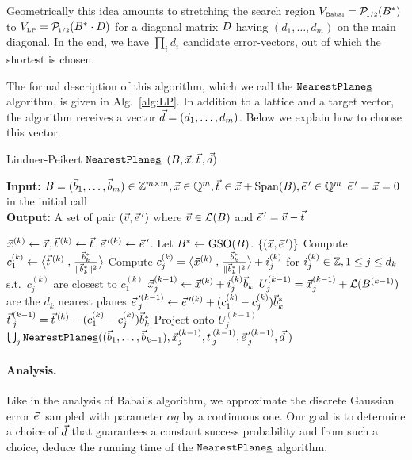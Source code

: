 Geometrically this idea amounts to stretching the search region $V_{{\mbox{\tiny Babai}}} = \smash{\mathcal{P}\mkern-3mu_{\mbox{\tiny 1/2}}}(B^*)$ to $V_{{\mbox{\tiny LP}}} = \smash{\mathcal{P}\mkern-3mu_{\mbox{\tiny 1/2}}}(B^* \cdot D)$ for a diagonal matrix $D$ having $(d_1, \ldots, d_m)$ on the main diagonal. In the end, we have $\prod_i d_i$ candidate error-vectors, out of which the shortest is chosen. 

The formal description of this algorithm, which we call the $\texttt{NearestPlane\underline{s}}$ algorithm, is given in Alg.~\ref{alg:LP}. In addition to a lattice and a target vector, the algorithm receives a vector $\vec d = (d_1, \ldots, d_m)$. Below we explain how to choose this vector.
%
%
\setlength{\intextsep}{\medskipamount}
\begin{algorithm}[h]
\caption{Lindner-Peikert $\texttt{NearestPlane\underline{s}}$ $(\BMat, \xvec, \protect \tvec, \dvec)$}
\label{alg:LP}
\textbf{Input:} $\BMat=(\bvec_1, \ldots, \bvec_m) \in \Z^{m \times m}, \xvec \in \Q^m, \tvec \in \xvec+\Span(\BMat), \evec' \in \Q^m$ \hfill \Comment $\evec'=\xvec=0$ in the initial call\\
\textbf{Output:} A set of pair $(\vvec, \evec')$ where $\vvec \in \Lat(\BMat)$ and $\evec' = \vvec - \tvec$
\begin{algorithmic}[1]
\State $\xvec^{(k)}\gets \xvec, \tvec^{(k)}\gets \tvec,\evec'^{(k)}\gets\evec'$. 
\State Let $B^* \gets \operatorname{GSO}(B)$. 
 \Return $\{(\xvec,\evec') \}$
\EndIf
\State Compute $c^{(k)}_1 \gets \bigScProd{\tvec^{(k)}}{\frac{\wbvec_k}{\vphantom{\scalebox{1.6}x^2} \|\wbvec_k \|^2}}$
\State Compute $c^{(k)}_j = \bigScProd{\xvec^{(k)}}{\frac{\wbvec_k}{\vphantom{\scalebox{1.6}x^2} \|{\wbvec_k}\|^2}} + i^{(k)}_j$ for $i^{(k)}_j \in {{\mathbb Z}}, 1 \leq j \leq d_k$ s.t.\ $c^{(k)}_j$ are closest to $c^{(k)}_1$ \label{algline:LPChoosePlane}
		\State $\vec x^{(k-1)}_j \gets \vec x^{(k)}+i^{(k)}_j \vec b_k$ \label{algline:LPChooseTranslate}
		\Comment $U_j^{(k-1)} = \vec x^{(k-1)}_j+\mathcal{L}(B^{(k-1)})$ are the $d_k$ nearest planes
		\State $\evec'^{(k-1)}_j \gets \evec'^{(k)} + (c^{(k)}_1-c^{(k)}_j)\wbvec_k$ \label{algline:LPComputeError}
		\State $\tvec^{(k-1)}_j =\tvec^{(k)} - (c^{(k)}_1-c^{(k)}_j)\wbvec_k$ \label{algline:LPProjectTarget} \Comment Project onto $U_j^{(k-1)}$ 
\State \Return $\bigcup_j \NPs ((\bvec_1,\ldots,\bvec_{k-1}), \xvec^{(k-1)}_j,\tvec^{(k-1)}_j,\evec'^{(k-1)}_j, \dvec\mkern5mu)$
\EndFor
\end{algorithmic} 
\end{algorithm}

\paragraph{Analysis.} Like in the analysis of Babai's algorithm, we approximate the discrete Gaussian error $\evec$ sampled with parameter $\alpha q$ by a continuous one. Our goal is to determine a choice of $\vec d$ that guarantees a constant success probability and from such a choice, deduce the running time of the $\texttt{NearestPlane\underline{s}}$ algorithm. 

